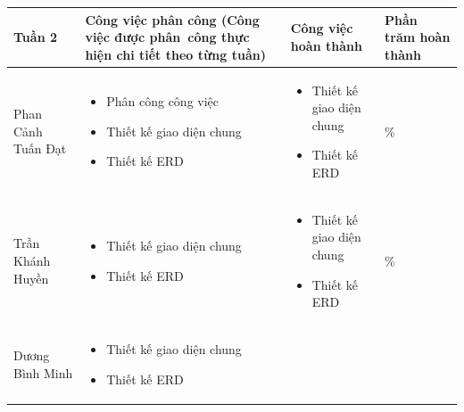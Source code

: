 \documentclass[a4paper,12pt]{report}
\begin{document}
\noindent
\begin{center}
    \begin{longtable}{|>{\centering\arraybackslash}p{3cm}|
        >{\centering\arraybackslash}p{5.5cm}|
        >{\centering\arraybackslash}p{5.5cm}|
        >{\centering\arraybackslash}p{1.5cm}|}
        \hline
        \textbf{Tuần 2}                &
        \textbf{Công việc phân công \newline
            (Công việc được phân~công thực hiện chi tiết theo từng tuần)
        }                              &
        \textbf{Công việc hoàn thành}  &
        \textbf{Phần trăm hoàn thành}          \\
        \hline
        Phan Cảnh Tuấn Đạt             &
        \begin{itemize}
            \item Phân công công việc
            \item Thiết kế giao diện chung
            \item Thiết kế ERD
        \end{itemize} &
        \begin{itemize}
            \item Thiết kế giao diện chung
            \item Thiết kế ERD
        \end{itemize}
                                       & 100\% \\
        \hline
        Trần Khánh Huyền               &
        \begin{itemize}
            \item Thiết kế giao diện chung
            \item Thiết kế ERD
        \end{itemize} &
        \begin{itemize}
            \item Thiết kế giao diện chung
            \item Thiết kế ERD
        \end{itemize}
                                       & 100\% \\
        \hline
        Dương Bình Minh                &
        \begin{itemize}
            \item Thiết kế giao diện chung
            \item Thiết kế ERD
        \end{itemize}
                                       &
        \begin{itemize}

\end{itemize}
\end{longtable}
\end{center}
\end{document}
